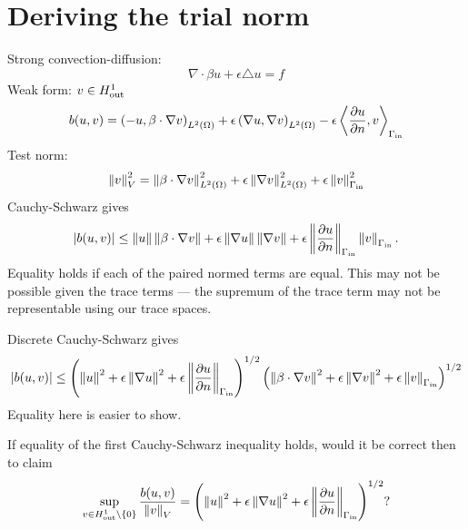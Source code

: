 \documentclass[10pt]{article}
\newcommand{\del}{\triangle}
\newcommand{\grad}{\nabla}
\renewcommand{\div}{\grad \cdot}
\newcommand{\pd}[2]{\frac{\partial#1}{\partial#2}}
\newcommand{\nor}[1]{\left\| #1 \right\|}
\newcommand{\LRp}[1]{\left( #1 \right)}
\newcommand{\LRa}[1]{\left\langle #1 \right\rangle}
\newcommand{\LRb}[1]{\left| #1 \right|}
\newcommand{\LRc}[1]{\left\{ #1 \right\}}
\renewcommand{\L}{L^2\LRp{\Omega}}
\begin{document}
\section{Deriving the trial norm}

Strong convection-diffusion: 
\[
\div{\beta u} + \epsilon\del u = f
\]
Weak form: $v\in H^1_{\rm out}$
\[
b(u,v) = \LRp{-u,\beta\cdot\grad v}_{\L} + \epsilon\LRp{\grad u,\grad v}_{\L} - \epsilon\LRa{\pd{u}{n},v}_{\Gamma_{\rm in}}
\]
Test norm:
\[
\nor{v}^2_V = \nor{\beta\cdot\grad v}_{\L}^2 + \epsilon\nor{\grad{v}}^2_{\L} + \epsilon\nor{v}^2_{\Gamma_{\rm in}}
\]
Cauchy-Schwarz gives 
\[
\LRb{b(u,v)} \leq \nor{u} \nor{\beta\cdot\grad v} + \epsilon\nor{\grad{u}}\nor{\grad v} + \epsilon\nor{\pd{u}{n}}_{\Gamma_{\rm in}}\nor{v}_{\Gamma_{\rm in}}.
\]
Equality holds if each of the paired normed terms are equal.  This may not be possible given the trace terms --- the supremum of the trace term may not be representable using our trace spaces.  

Discrete Cauchy-Schwarz gives
\[
\LRb{b(u,v)} \leq \LRp{\nor{u}^2+\epsilon\nor{\grad{u}}^2 + \epsilon\nor{\pd{u}{n}}_{\Gamma_{\rm in}}}^{1/2}\LRp{\nor{\beta\cdot\grad v}^2+\epsilon\nor{\grad{v}}^2 + \epsilon\nor{v}_{\Gamma_{\rm in}}}^{1/2}
\]
Equality here is easier to show.  

If equality of the first Cauchy-Schwarz inequality holds, would it be correct then to claim
\[
\sup_{v\in H^1_{\rm out}\setminus\LRc{0}} \frac{ b(u,v)}{\nor{v}_V} =  \LRp{\nor{u}^2+\epsilon\nor{\grad{u}}^2 + \epsilon\nor{\pd{u}{n}}_{\Gamma_{\rm in}}}^{1/2}?
\]
\end{document}
